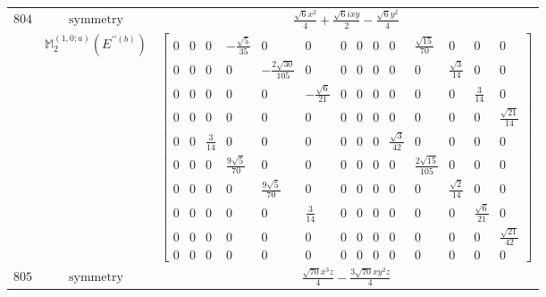 \documentclass[fleqn,8pt,landscape]{jsarticle}
\begin{document}
\begin{longtable}{ccc}
$ 804 $ & $ \text{symmetry} $ & $ \frac{\sqrt{6} x^{2}}{4} + \frac{\sqrt{6} i x y}{2} - \frac{\sqrt{6} y^{2}}{4} $ \\
$  $ & $ \mathbb{M}_{2}^{(1,0;a)}(E^{\prime\prime(b)}) $ & $ \begin{bmatrix} 0 & 0 & 0 & - \frac{\sqrt{5}}{35} & 0 & 0 & 0 & 0 & 0 & 0 & \frac{\sqrt{15}}{70} & 0 & 0 & 0 \\ 0 & 0 & 0 & 0 & - \frac{2 \sqrt{30}}{105} & 0 & 0 & 0 & 0 & 0 & 0 & \frac{\sqrt{3}}{14} & 0 & 0 \\ 0 & 0 & 0 & 0 & 0 & - \frac{\sqrt{6}}{21} & 0 & 0 & 0 & 0 & 0 & 0 & \frac{3}{14} & 0 \\ 0 & 0 & 0 & 0 & 0 & 0 & 0 & 0 & 0 & 0 & 0 & 0 & 0 & \frac{\sqrt{21}}{14} \\ 0 & 0 & \frac{3}{14} & 0 & 0 & 0 & 0 & 0 & 0 & \frac{\sqrt{3}}{42} & 0 & 0 & 0 & 0 \\ 0 & 0 & 0 & \frac{9 \sqrt{5}}{70} & 0 & 0 & 0 & 0 & 0 & 0 & \frac{2 \sqrt{15}}{105} & 0 & 0 & 0 \\ 0 & 0 & 0 & 0 & \frac{9 \sqrt{5}}{70} & 0 & 0 & 0 & 0 & 0 & 0 & \frac{\sqrt{2}}{14} & 0 & 0 \\ 0 & 0 & 0 & 0 & 0 & \frac{3}{14} & 0 & 0 & 0 & 0 & 0 & 0 & \frac{\sqrt{6}}{21} & 0 \\ 0 & 0 & 0 & 0 & 0 & 0 & 0 & 0 & 0 & 0 & 0 & 0 & 0 & \frac{\sqrt{21}}{42} \\ 0 & 0 & 0 & 0 & 0 & 0 & 0 & 0 & 0 & 0 & 0 & 0 & 0 & 0 \end{bmatrix} $ \\ \hline
$ 805 $ & $ \text{symmetry} $ & $ \frac{\sqrt{70} x^{3} z}{4} - \frac{3 \sqrt{70} x y^{2} z}{4} $ \\

\end{longtable}
\end{document}
